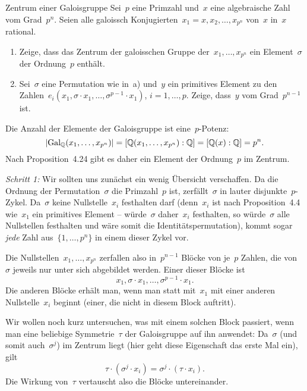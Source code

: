 \documentclass{algblatt}
\begin{document}
\begin{aufgabe}{Zentrum einer Galoisgruppe}
Sei~$p$ eine Primzahl und~$x$ eine algebraische Zahl vom Grad~$p^n$. Seien alle
galoissch Konjugierten~$x_1 = x, x_2, \ldots, x_{p^n}$ von~$x$ in~$x$ rational.
\begin{enumerate}
\item Zeige, dass das Zentrum der galoisschen Gruppe der~$x_1,\ldots,x_{p^n}$ ein
Element~$\sigma$ der Ordnung~$p$ enthält.
\item Sei~$\sigma$ eine Permutation wie in~a) und~$y$ ein primitives Element
zu den Zahlen~$e_i(x_1,\sigma\cdot x_1,\ldots,\sigma^{p-1}\cdot x_1)$, $i =
1,\ldots,p$. Zeige, dass~$y$ vom Grad~$p^{n-1}$ ist.
\end{enumerate}

\begin{loesungE}
\item Die Anzahl der Elemente der Galoisgruppe ist eine~$p$-Potenz:
\[ |\mathrm{Gal}_{\mathbb{Q}}(x_1,\ldots,x_{p^n})| = [\mathbb{Q}(x_1,\ldots,x_{p^n}):\mathbb{Q}] =
[\mathbb{Q}(x):\mathbb{Q}] = p^n. \]
Nach Proposition~4.24 gibt es daher ein Element der Ordnung~$p$ im Zentrum.

\item \emph{Schritt 1:}
Wir sollten uns zunächst ein wenig Übersicht verschaffen. Da die Ordnung
der Permutation~$\sigma$ die Primzahl~$p$ ist, zerfällt~$\sigma$ in lauter
disjunkte~$p$-Zykel. Da~$\sigma$ keine Nullstelle~$x_i$ festhalten darf
(denn~$x_i$ ist nach Proposition~4.4 wie~$x_1$ ein primitives Element --
würde~$\sigma$ daher~$x_i$ festhalten, so würde~$\sigma$ alle Nullstellen
festhalten und wäre somit die Identitätspermutation), kommt sogar \emph{jede} Zahl
aus~$\{1,\ldots,p^n\}$ in einem dieser Zykel vor.

Die Nullstellen~$x_1,\ldots,x_{p^n}$ zerfallen also in~$p^{n-1}$ Blöcke von
je~$p$ Zahlen, die von~$\sigma$ jeweils nur unter sich abgebildet werden. Einer
dieser Blöcke ist
\begin{equation}\label{block}
  x_1, \sigma \cdot x_1, \ldots, \sigma^{p-1} \cdot x_1. \tag{$\star$}
\end{equation}
Die anderen Blöcke erhält man, wenn man statt mit~$x_1$ mit einer anderen
Nullstelle~$x_i$ beginnt (einer, die nicht in diesem Block auftritt).

Wir wollen noch kurz untersuchen, was mit einem solchen Block passiert, wenn
man eine beliebige Symmetrie~$\tau$ der Galoisgruppe auf ihn anwendet:
Da~$\sigma$ (und somit auch~$\sigma^j$) im Zentrum liegt (hier geht diese
Eigenschaft das erste Mal ein), gilt
\[ \tau \cdot (\sigma^j \cdot x_i) = \sigma^j \cdot (\tau \cdot x_i). \]
Die Wirkung von~$\tau$ vertauscht also die Blöcke untereinander.


\end{loesungE}
\end{aufgabe}
\end{document}

